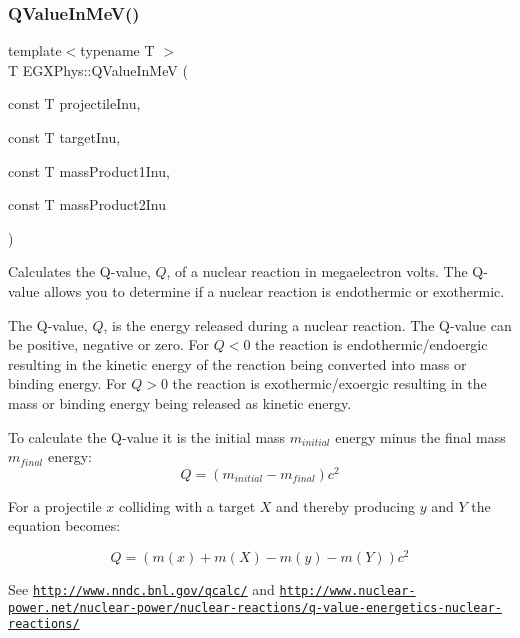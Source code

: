 \mbox{\label{group___e_g_x_phys-_q_value_ga53f07ac44d3d3b217b8c5b7aa548e3fc}} 
\subsubsection{\texorpdfstring{Q\+Value\+In\+Me\+V()}{QValueInMeV()}}
{\footnotesize\ttfamily template$<$typename T $>$ \\
T E\+G\+X\+Phys\+::\+Q\+Value\+In\+MeV (\begin{DoxyParamCaption}\item[{const T}]{projectile\+Inu,  }\item[{const T}]{target\+Inu,  }\item[{const T}]{mass\+Product1\+Inu,  }\item[{const T}]{mass\+Product2\+Inu }\end{DoxyParamCaption})}



Calculates the Q-\/value, $Q$, of a nuclear reaction in megaelectron volts. The Q-\/value allows you to determine if a nuclear reaction is endothermic or exothermic. 

The Q-\/value, $Q$, is the energy released during a nuclear reaction. The Q-\/value can be positive, negative or zero. For $Q < 0$ the reaction is endothermic/endoergic resulting in the kinetic energy of the reaction being converted into mass or binding energy. For $Q > 0$ the reaction is exothermic/exoergic resulting in the mass or binding energy being released as kinetic energy.

To calculate the Q-\/value it is the initial mass $m_{initial}$ energy minus the final mass $m_{final}$ energy\+: \[Q = \left ( m_{initial}-m_{final}\right ) c^2\]

For a projectile $x$ colliding with a target $X$ and thereby producing $y$ and $Y$ the equation becomes\+:

\[Q = \left ( m(x) + m (X) - m(y) - m(Y) \right ) c^2\]

See \href{http://www.nndc.bnl.gov/qcalc/}{\tt http\+://www.\+nndc.\+bnl.\+gov/qcalc/} and \href{http://www.nuclear-power.net/nuclear-power/nuclear-reactions/q-value-energetics-nuclear-reactions/}{\tt http\+://www.\+nuclear-\/power.\+net/nuclear-\/power/nuclear-\/reactions/q-\/value-\/energetics-\/nuclear-\/reactions/}

